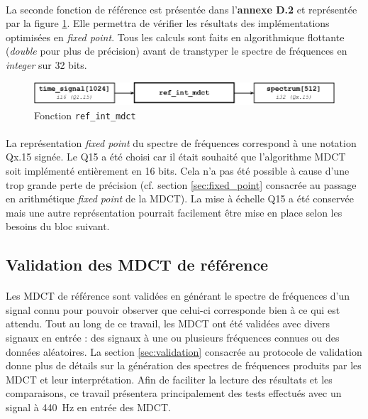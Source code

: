 \documentclass{article}
\begin{document}
    \paragraph{}
    La seconde fonction de référence est présentée dans l'\textbf{annexe D.2} et représentée par la figure \ref{fig:func_ref_int_mdct}. Elle permettra de vérifier les résultats des implémentations optimisées en \emph{fixed point}. Tous les calculs sont faits en algorithmique flottante (\emph{double} pour plus de précision) avant de transtyper le spectre de fréquences en \emph{integer} sur 32 bits.
    \begin{figure}[H]
        \centering
        \includegraphics[width=.8\linewidth]{./images/func_ref_int_mdct.pdf}
        \caption{Fonction \texttt{ref\_int\_mdct}}
        \label{fig:func_ref_int_mdct}
    \end{figure}
    
    \paragraph{}
    La représentation \emph{fixed point} du spectre de fréquences correspond à une notation Qx.15 signée. Le Q15 a été choisi car il était souhaité que l'algorithme MDCT soit implémenté entièrement en 16 bits. Cela n'a pas été possible à cause d'une trop grande perte de précision (cf. section \ref{sec:fixed_point} consacrée au passage en arithmétique \emph{fixed point} de la MDCT). La mise à échelle Q15 a été conservée mais une autre représentation pourrait facilement être mise en place selon les besoins du bloc suivant.


    \subsection{Validation des MDCT de référence}

    \paragraph{}
    Les MDCT de référence sont validées en générant le spectre de fréquences d'un signal connu pour pouvoir observer que celui-ci corresponde bien à ce qui est attendu. Tout au long de ce travail, les MDCT ont été validées avec divers signaux en entrée : des signaux à une ou plusieurs fréquences connues ou des données aléatoires. La section \ref{sec:validation} consacrée au protocole de validation donne plus de détails sur la génération des spectres de fréquences produits par les MDCT et leur interprétation. Afin de faciliter la lecture des résultats et les comparaisons, ce travail présentera principalement des tests effectués avec un signal à \SI{440}{\hertz} en entrée des MDCT.
\end{document}
